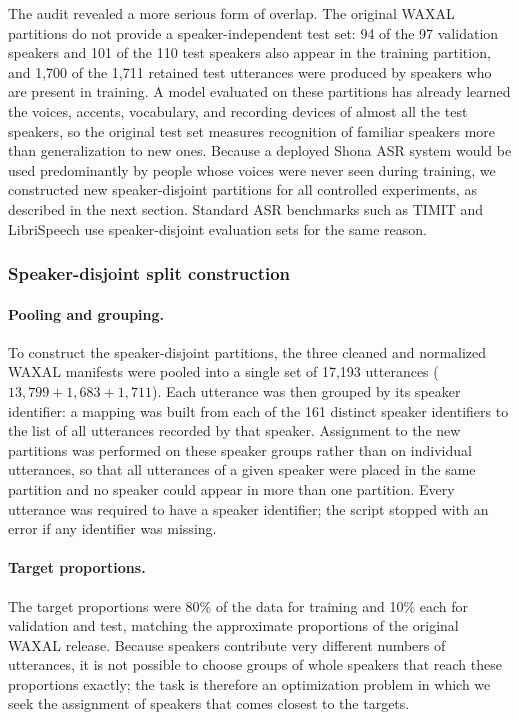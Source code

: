 The audit revealed a more serious form of overlap. The original WAXAL partitions
do not provide a speaker-independent test set: 94 of the 97 validation speakers
and 101 of the 110 test speakers also appear in the training partition, and 1,700
of the 1,711 retained test utterances were produced by speakers who are present in
training. A model evaluated on these partitions has already learned the voices,
accents, vocabulary, and recording devices of almost all the test speakers, so
the original test set measures recognition of familiar speakers more than
generalization to new ones. Because a deployed Shona ASR system would be used
predominantly by people whose voices were never seen during training, we
constructed new speaker-disjoint partitions for all controlled experiments, as
described in the next section. Standard ASR benchmarks such as TIMIT
\citep{Garofolo1993} and LibriSpeech \citep{Panayotov2015} use speaker-disjoint
evaluation sets for the same reason.

\subsubsection{Speaker-disjoint split construction}
\label{sec:speaker-disjoint}

\paragraph{Pooling and grouping.}
To construct the speaker-disjoint partitions, the three cleaned and normalized
WAXAL manifests were pooled into a single set of 17,193 utterances
($13{,}799 + 1{,}683 + 1{,}711$). Each utterance was then grouped by its speaker
identifier: a mapping was built from each of the 161 distinct speaker identifiers
to the list of all utterances recorded by that speaker. Assignment to the new
partitions was performed on these speaker groups rather than on individual
utterances, so that all utterances of a given speaker were placed in the same
partition and no speaker could appear in more than one partition. Every
utterance was required to have a speaker identifier; the script stopped with an
error if any identifier was missing.

\paragraph{Target proportions.}
The target proportions were 80\% of the data for training and 10\% each for
validation and test, matching the approximate proportions of the original WAXAL
release. Because speakers contribute very different numbers of utterances, it is
not possible to choose groups of whole speakers that reach these proportions
exactly; the task is therefore an optimization problem in which we seek the
assignment of speakers that comes closest to the targets.

